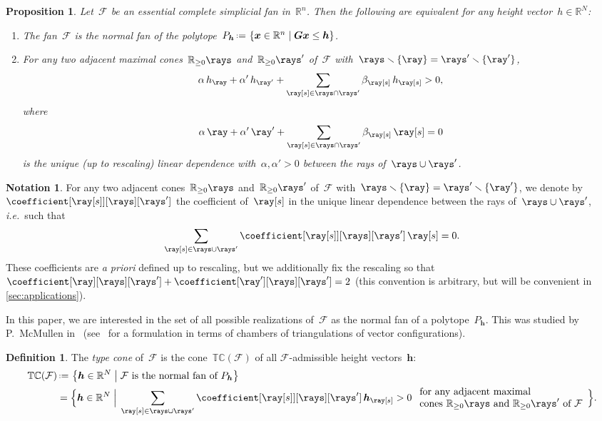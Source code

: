 \documentclass{amsart}
\newtheorem{proposition}[theorem]{Proposition}
\theoremstyle{definition}
\newtheorem{definition}[theorem]{Definition}
\newtheorem{notation}[theorem]{Notation}
\newcommand{\R}{\mathbb{R}} %
\renewcommand{\b}[1]{{\boldsymbol{#1}}} %
\newcommand{\set}[2]{\left\{ #1 \;\middle|\; #2 \right\}} %
\newcommand{\Bigset}[2]{\Big\{ #1 \;\Big|\; #2 \Big\}} %
\newcommand{\ssm}{\smallsetminus} %
\newcommand{\eqdef}{\mbox{\,\raisebox{0.2ex}{\scriptsize\ensuremath{\mathrm:}}\ensuremath{=}\,}} %
\newcommand{\ie}{\textit{i.e.}~} %
\newcommand{\apriori}{\textit{a priori}} %
\newcommand{\darkblue}{\color{darkblue}} %
\newcommand{\defn}[1]{\textsl{\darkblue #1}} %
\newcommand{\Fan}{\mathcal{F}} %
\newcommand{\typeCone}{\mathbb{TC}} %
\begin{document}
\begin{proposition}
\label{prop:characterizationPolytopalFan}
Let~$\Fan$ be an essential complete simplicial fan in~$\R^n$. Then the following are equivalent for any height vector~$h \in \R^N$:
\begin{enumerate}
\item The fan~$\Fan$ is the normal fan of the polytope~$P_\b{h} \eqdef \set{\b{x} \in \R^n}{\b{G}\b{x} \le \b{h}}$.
\item For any two adjacent maximal cones~$\R_{\ge0}\rays$ and~$\R_{\ge0}\rays'$ of~$\Fan$ with~$\rays \ssm \{\ray\} = \rays' \ssm \{\ray'\}$,
\[
\alpha \, h_{\ray} + \alpha' \, h_{\ray'} + \sum_{\ray[s] \in \rays \cap \rays'} \beta_{\ray[s]} \, h_{\ray[s]} > 0,
\]
where
\[
\alpha \, \ray + \alpha' \, \ray' + \sum_{\ray[s] \in \rays \cap \rays'} \beta_{\ray[s]} \, \ray[s] = 0
\]
is the unique (up to rescaling) linear dependence with~$\alpha, \alpha' > 0$ between the rays of~$\rays \cup \rays'$.
\end{enumerate}
\end{proposition}

\begin{notation}
For any two adjacent cones~$\R_{\ge0}\rays$ and~$\R_{\ge0}\rays'$ of~$\Fan$ with~$\rays \ssm \{\ray\} = \rays' \ssm \{\ray'\}$, we denote by~$\coefficient[{\ray[s]}][\rays][\rays']$ the coefficient of~$\ray[s]$ in the unique linear dependence between the rays of~$\rays \cup \rays'$, \ie such that
\[
\sum_{\ray[s] \in \rays \cup \rays'} \coefficient[{\ray[s]}][\rays][\rays'] \, \ray[s] = 0.
\]
These coefficients are \apriori{} defined up to rescaling, but we additionally fix the rescaling so that~${\coefficient[\ray][\rays][\rays'] + \coefficient[\ray'][\rays][\rays'] = 2}$ (this convention is arbitrary, but will be convenient in \cref{sec:applications}).
\end{notation}

In this paper, we are interested in the set of all possible realizations of~$\Fan$ as the normal fan of a polytope~$P_\b{h}$. This was studied by P.~McMullen in~\cite{McMullen-typeCone} (see~\cite[Sect.~9.5]{DeLoeraRambauSantos} for a formulation in terms of chambers of triangulations of vector configurations).

\begin{definition}
\label{def:typeCone}
The \defn{type cone} of~$\Fan$ is the cone~$\typeCone(\Fan)$ of all $\Fan$-admissible height vectors~$\b{h}$:
\begin{align*}
\typeCone(\Fan) & \eqdef \set{\b{h} \in \R^N}{\Fan \text{ is the normal fan of } P_\b{h}} \\
& = \Bigset{\b{h} \in \R^N}{\sum_{\ray[s] \in \rays \cup \rays'} \coefficient[{\ray[s]}][\rays][\rays'] \, \b{h}_{\ray[s]} > 0 \; \begin{array}{l} \text{for any adjacent maximal} \\ \text{cones~$\R_{\ge0}\rays$ and~$\R_{\ge0}\rays'$ of~$\Fan$} \end{array}}.
\end{align*}
\end{definition}
\end{document}

